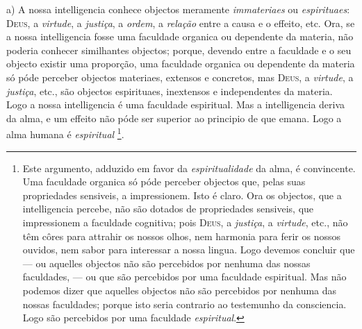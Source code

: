 a) A nossa intelligencia conhece objectos meramente \emph{immateriaes} ou \emph{espirituaes}: \textsc{Deus}, a \emph{virtude}, a \emph{justiça}, a \emph{ordem}, a \emph{relação} entre a causa e o effeito, etc. Ora, se a nossa intelligencia fosse uma faculdade organica ou dependente da materia, não poderia conhecer similhantes objectos; porque, devendo entre a faculdade e o seu objecto existir uma proporção, uma faculdade organica ou dependente da materia só   póde perceber objectos materiaes, extensos e concretos, mas \textsc{Deus}, a \emph{virtude}, a \emph{justiça}, etc., são objectos espirituaes, inextensos e independentes da materia. Logo a nossa intelligencia é uma faculdade espiritual. Mas a intelligencia deriva da alma, e um effeito não póde ser superior ao principio de que emana. Logo a alma humana é \emph{espiritual} \footnote{Este argumento, adduzido em favor da \emph{espiritualidade} da alma, é convincente. Uma faculdade organica só póde perceber objectos que, pelas suas propriedades sensiveis, a impressionem. Isto é claro. Ora os objectos, que a intelligencia percebe, não são dotados de propriedades sensiveis, que impressionem a faculdade cognitiva; pois \textsc{Deus}, a \emph{justiça}, a \emph{virtude}, etc., não têm côres para attrahir os nossos olhos, nem harmonia para ferir os nossos ouvidos, nem sabor para interessar a nossa lingua. Logo devemos concluir que --- ou aquelles objectos não são percebidos por nenhuma das nossas faculdades, --- ou que são percebidos por uma faculdade espiritual. Mas não podemos dizer que aquelles objectos não são percebidos por nenhuma das nossas faculdades; porque isto seria contrario ao testemunho da consciencia. Logo são percebidos por uma faculdade \emph{espiritual}.}.

